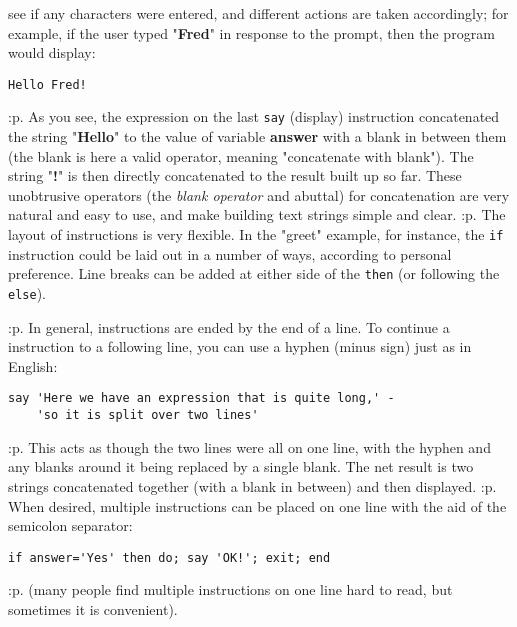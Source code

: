 see if any characters were entered, and different actions are taken
accordingly; for example, if the user typed "\textbf{Fred}" in
response to the prompt, then the program would display:
\begin{verbatim}
Hello Fred!
\end{verbatim}
:p.
As you see, the expression on the last \texttt{say} (display)
instruction concatenated the string "\textbf{Hello}" to the value
of variable \textbf{answer} with a blank in between them (the blank is
here a valid operator, meaning "concatenate with blank").  The
string "\textbf{!}" is then directly concatenated to the result
built up so far.  These unobtrusive operators (the \emph{blank
operator} and abuttal) for concatenation are very natural and easy
to use, and make building text strings simple and clear.
:p.
The layout of instructions is very flexible.  In the "greet"
example, for instance, the \texttt{if} instruction could be laid out in
a number of ways, according to personal preference.  Line breaks can be
added at either side of the \texttt{then} (or following the
\texttt{else}).

:p.
In general, instructions are ended by the end of a line.  To continue a
instruction to a following line, you can use a hyphen (minus sign) just as
in English:
\begin{verbatim}
say 'Here we have an expression that is quite long,' -
    'so it is split over two lines'
\end{verbatim}
:p.
This acts as though the two lines were all on one line, with the hyphen
and any blanks around it being replaced by a single blank.  The net
result is two strings concatenated together (with a blank in between)
and then displayed.
:p.
When desired, multiple instructions can be placed on one line with the
aid of the semicolon separator:
\begin{verbatim}
if answer='Yes' then do; say 'OK!'; exit; end
\end{verbatim}
:p.
(many people find multiple instructions on one line hard to read, but
sometimes it is convenient).
